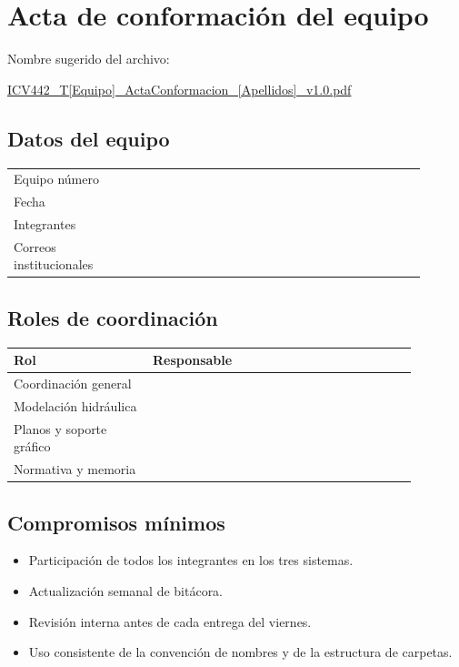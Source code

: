 \documentclass[11pt]{article}
\begin{document}

\section{Acta de conformaci\'on del equipo}
\begin{infobox}
Nombre sugerido del archivo:

\url{ICV442_T[Equipo]_ActaConformacion_[Apellidos]_v1.0.pdf}
\end{infobox}

\subsection*{Datos del equipo}
\begin{tabular}{p{0.20\linewidth} p{0.70\linewidth}}
\toprule
Equipo n\'umero & \\
Fecha & \\
Integrantes & \\
Correos institucionales & \\
\bottomrule
\end{tabular}

\subsection*{Roles de coordinaci\'on}
\begin{tabular}{p{0.30\linewidth} p{0.58\linewidth}}
\toprule
Rol & Responsable \\
\midrule
Coordinaci\'on general & \\
Modelaci\'on hidr\'aulica & \\
Planos y soporte gr\'afico & \\
Normativa y memoria & \\
\bottomrule
\end{tabular}

\subsection*{Compromisos m\'inimos}
\begin{itemize}
\item Participaci\'on de todos los integrantes en los tres sistemas.
\item Actualizaci\'on semanal de bit\'acora.
\item Revisi\'on interna antes de cada entrega del viernes.
\item Uso consistente de la convenci\'on de nombres y de la estructura de carpetas.
\end{itemize}
\end{document}
